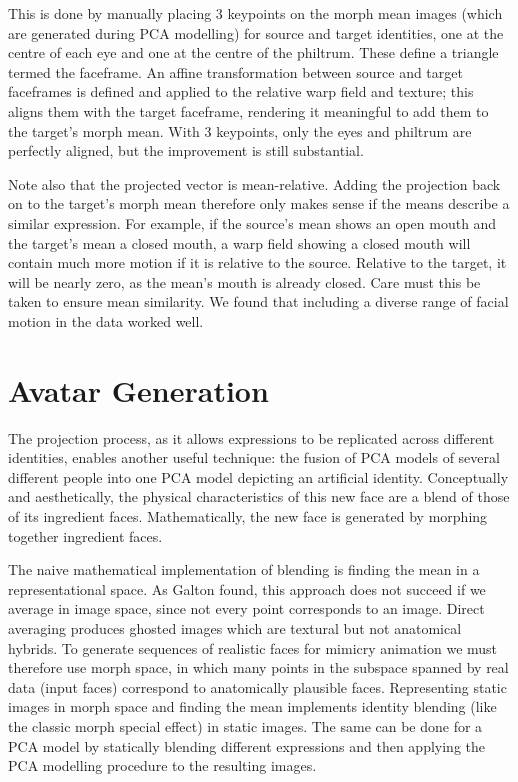 \documentclass[runningheads]{llncs}
\begin{document}
This is done by manually placing 3 keypoints on the morph mean images (which are generated during PCA modelling) for source and target identities, one at the centre of each eye and one at the centre of the philtrum. These define a triangle termed the faceframe. An affine transformation between source and target faceframes is defined and applied to the relative warp field and texture; this aligns them with the target faceframe, rendering it meaningful to add them to the target's morph mean. With 3 keypoints, only the eyes and philtrum are perfectly aligned, but the improvement is still substantial. 

Note also that the projected vector is mean-relative. Adding the projection back on to the target's morph mean therefore only makes sense if the means describe a similar expression. For example, if the source's mean shows an open mouth and the target's mean a closed mouth, a warp field showing a closed mouth will contain much more motion if it is relative to the source. Relative to the target, it will be nearly zero, as the mean's mouth is already closed. Care must this be taken to ensure mean similarity. We found that including a diverse range of facial motion in the data worked well.


\section{Avatar Generation}

The projection process, as it allows expressions to be replicated across different identities, enables another useful technique: the fusion of PCA models of several different people into one PCA model depicting an artificial identity. Conceptually and aesthetically, the physical characteristics of this new face are a blend of those of its ingredient faces. Mathematically, the new face is generated by morphing together ingredient faces.


The naive mathematical implementation of blending is finding the mean in a representational space. As Galton found\cite{galton1879composite}, this approach does not succeed if we average in image space, since not every point corresponds to an image. Direct averaging produces ghosted images which are textural but not anatomical hybrids. To generate sequences of realistic faces for mimicry animation we must therefore use morph space, in which many points in the subspace spanned by real data (input faces) correspond to anatomically plausible faces. Representing static images in morph space and finding the mean implements identity blending (like the classic morph special effect\cite{rotshtein2004morphing}) in static images. The same can be done for a PCA model by statically blending different expressions and then applying the PCA modelling procedure to the resulting images.
\end{document}
